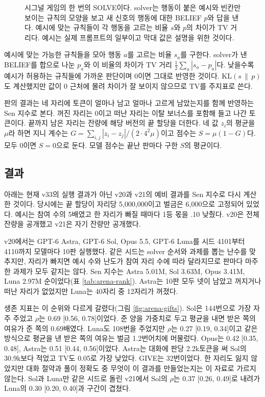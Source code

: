 \begin{figure}[t]
\centering
\resizebox{\linewidth}{!}{}
\caption{시그널 게임의 한 번의 SOLVE이다. solver는 행동이 붙은 예시와 빈칸만 보이는 규칙의 모양을 보고 새 신호의 행동에 대한 BELIEF $p$와 답을 낸다. 예시에 맞는 규칙들이 각 행동을 고르는 비율 $s$와 $p$의 차이가 TV 거리다. 예시는 실제 프롬프트의 일부이고 막대 값은 설명을 위한 것이다.}
\label{fig:signal}
\end{figure}

예시에 맞는 가능한 규칙들을 모아 행동 $a$를 고르는 비율 $s_a$를 구한다. solver가 낸 BELIEF를 합으로 나눈 $p_a$와 이 비율의 차이가 TV 거리 $\frac12\sum_a|s_a-p_a|$다. 낮을수록 예시가 허용하는 규칙들에 가까운 판단이며 0이면 그대로 반영한 것이다. KL$(s\,\|\,p)$도 계산했지만 값이 0 근처에 몰려 차이가 잘 보이지 않으므로 TV를 주지표로 쓴다. 

판의 결과는 네 자리에 토큰이 얼마나 남고 얼마나 고르게 남았는지를 함께 반영하는 Sen 지수로 본다. 꺼진 자리는 0이고 떠난 자리는 이탈 보너스를 포함해 들고 나간 토큰이다. 끝까지 남은 자리는 잔량에 해당 버전의 끝 할당을 더한다. 네 값 $z_i$의 평균을 $\mu$라 하면 지니 계수는 $G=\sum_{i,j}|z_i-z_j|/(2\cdot4^2\mu)$이고 점수는 $S=\mu(1-G)$다. 모두 0이면 $S=0$으로 둔다. 모델 점수는 끝난 판마다 구한 $S$의 평균이다.

\subsection{결과}\label{sec:results-arena}

아래는 현재 v33의 실행 결과가 아닌 v20과 v21의 예비 결과를 Sen 지수로 다시 계산한 것이다. 당시에는 끝 할당이 자리당 5,000,000이고 벌금은 6,000으로 고정되어 있었다. 예시는 참여 수의 5배였고 한 자리가 빠질 때마다 1등 몫을 .10 낮췄다. v20은 전체 잔량을 공개했고 v21은 자기 잔량만 공개했다.

v20에서는 GPT-6 Astra, GPT-6 Sol, Opus 5.5, GPT-6 Luna를 시드 4101부터 4110까지 모델마다 10판 실행했다. 같은 시드는 solver 순서와 과제를 뽑는 난수를 맞추지만, 자리가 빠지면 예시 수와 난도가 참여 자리 수에 따라 달라지므로 판마다 마주한 과제가 모두 같지는 않다. Sen 지수는 Astra 5.01M, Sol 3.63M, Opus 3.41M, Luna 2.97M 순이었다(표 \ref{tab:arena-rank}). Astra는 10판 모두 넷이 남았고 꺼지거나 떠난 자리가 없었지만 Luna는 40자리 중 12자리가 꺼졌다.

생존 지표는 이 순위와 다르게 갈렸다(그림 \ref{fig:arena-gifts}). Sol은 144번으로 가장 자주 주었고 $\rho$는 0.69 [0.56, 0.78]이었다. 준 양을 가중치로 두고 평균을 내면 받은 쪽의 여유가 준 쪽의 0.69배였다. Luna도 108번을 주었지만 $\rho$는 0.27 [0.19, 0.34]이고 같은 방식으로 평균을 낸 받은 쪽의 여유는 벌금 1.2번어치에 머물렀다. Opus는 0.42 [0.35, 0.48], Astra는 0.51 [0.44, 0.56]이었다. Astra는 대화에 판당 2.2k토큰을 써 Sol의 30.9k보다 적었고 TV도 0.05로 가장 낮았다. GIVE는 32번이었다. 한 자리도 잃지 않았지만 대화 절약과 풀이 정확도 중 무엇이 이 결과를 만들었는지는 이 자료로 가르지 않는다. Sol과 Luna만 같은 시드로 돌린 v21에서 Sol의 $\rho$는 0.37 [0.26, 0.49]로 내려가 Luna의 0.30 [0.20, 0.40]과 구간이 겹쳤다.

